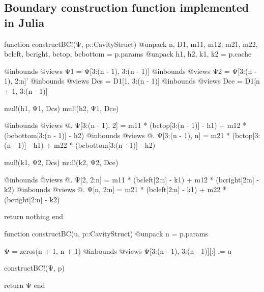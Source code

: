 
\begin{appendices}

\section{Boundary construction function implemented in Julia}

\begin{jllisting}[caption={Boundary construction function (filling in the outer
  two rows and columns of matrix $\Psi$), The inplace and out of place version of the function}]
function constructBC!(Ψ, p::CavityStruct)
    @unpack n, D1, m11, m12, m21, m22, bcleft, bcright, bctop, bcbottom = p.params
    @unpack h1, h2, k1, k2 = p.cache

    @inbounds @views Ψ1 = Ψ[3:(n - 1), 3:(n - 1)]
    @inbounds @views Ψ2 = Ψ[3:(n - 1), 2:n]'
    @inbounds @views Dcs = D1[1, 3:(n - 1)]
    @inbounds @views Dce = D1[n + 1, 3:(n - 1)]

    mul!(h1, Ψ1, Dcs)
    mul!(h2, Ψ1, Dce)

    @inbounds @views @. Ψ[3:(n - 1), 2] = m11 * (bctop[3:(n - 1)] - h1) +
                                          m12 * (bcbottom[3:(n - 1)] - h2)
    @inbounds @views @. Ψ[3:(n - 1), n] = m21 * (bctop[3:(n - 1)] - h1) +
                                          m22 * (bcbottom[3:(n - 1)] - h2)

    mul!(k1, Ψ2, Dcs)
    mul!(k2, Ψ2, Dce)

    @inbounds @views @. Ψ[2, 2:n] = m11 * (bcleft[2:n] - k1) + m12 * (bcright[2:n] - k2)
    @inbounds @views @. Ψ[n, 2:n] = m21 * (bcleft[2:n] - k1) + m22 * (bcright[2:n] - k2)

    return nothing
end

function constructBC(u, p::CavityStruct)
    @unpack n = p.params

    Ψ = zeros(n + 1, n + 1)
    @inbounds @views Ψ[3:(n - 1), 3:(n - 1)][:] .= u

    constructBC!(Ψ, p)

    return Ψ
end
\end{jllisting}




\end{appendices}
